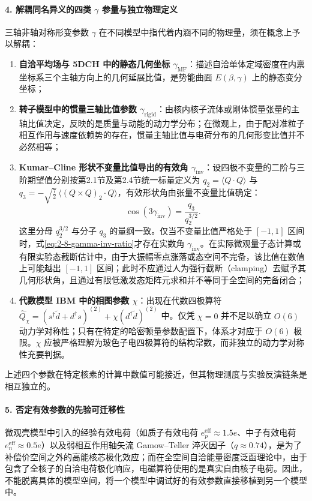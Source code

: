 \paragraph{4. 解耦同名异义的四类 $\gamma$ 参量与独立物理定义}
三轴非轴对称形变参数 $\gamma$ 在不同模型中指代着内涵不同的物理量，须在概念上予以解耦：
\begin{enumerate}
\item \textbf{自洽平均场与 5DCH 中的静态几何坐标 $\gamma_{\mathrm{MF}}$}：描述自洽单体定域密度在内禀坐标系三个主轴方向上的几何延展比值，是势能曲面 $E(\beta, \gamma)$ 上的静态变分坐标；
\item \textbf{转子模型中的惯量三轴比值参数 $\gamma_{\mathrm{rigid}}$}：由核内核子流体或刚体惯量张量的主轴比值决定，反映的是质量与动能的动力学分布；在微观上，由于配对准粒子相互作用与速度依赖势的存在，惯量主轴比值与电荷分布的几何形变比值并不必然相等；
\item \textbf{Kumar--Cline 形状不变量比值导出的有效角 $\gamma_{\mathrm{inv}}$}：设四极不变量的二阶与三阶期望值分别按第2.1节及第2.4节统一标量定义为 $q_2 = \langle Q \cdot Q \rangle$ 与 $q_3 = -\sqrt{\frac{7}{2}}\,\langle (Q \times Q)_2 \cdot Q \rangle$，有效形状角由张量不变量比值确定：
\begin{equation}\label{eq:2-8-gamma-inv-ratio}
\cos(3\gamma_{\mathrm{inv}}) = \frac{q_3}{q_2^{3/2}} .
\end{equation}
这里分母 $q_2^{3/2}$ 与分子 $q_3$ 的量纲一致。仅当不变量比值严格处于 $[-1, 1]$ 区间时，式\eqref{eq:2-8-gamma-inv-ratio}才存在实数角 $\gamma_{\mathrm{inv}}$。在实际微观量子态计算或有限实验态截断估计中，由于大振幅零点涨落或态空间不完备，该比值在数值上可能越出 $[-1, 1]$ 区间；此时不应通过人为强行截断（clamping）去赋予其几何形状角，且通过有限低激发态矩阵元求和并不等同于全空间的完备闭合；
\item \textbf{代数模型 IBM 中的相图参数 $\chi$}：出现在代数四极算符 $\hat{Q}_\chi = (s^\dagger \tilde{d} + d^\dagger s)^{(2)} + \chi (d^\dagger \tilde{d})^{(2)}$ 中。仅凭 $\chi = 0$ 并不足以确立 $O(6)$ 动力学对称性；只有在特定的哈密顿量参数配置下，体系才对应于 $O(6)$ 极限。$\chi$ 应被严格理解为玻色子电四极算符的结构常数，而非独立的动力学对称性充要判据。
\end{enumerate}
上述四个参数在特定核素的计算中数值可能接近，但其物理测度与实验反演链条是相互独立的。

\paragraph{5. 否定有效参数的先验可迁移性}
微观壳模型中引入的经验有效电荷（如质子有效电荷 $e_p^{\mathrm{eff}} \approx 1.5e$、中子有效电荷 $e_n^{\mathrm{eff}} \approx 0.5e$）以及弱相互作用轴矢流 Gamow--Teller 淬灭因子（$q \approx 0.74$），是为了补偿价空间之外的高能核芯极化效应；而在全空间自洽能量密度泛函理论中，由于包含了全核子的自洽电荷极化响应，电磁算符使用的是真实自由核子电荷。因此，不能脱离具体的模型空间，将一个模型中调试好的有效参数直接移植到另一个模型中。

